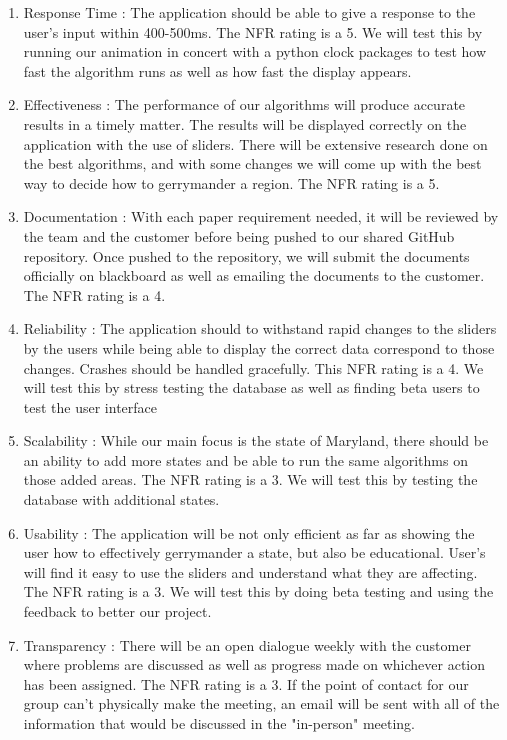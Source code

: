 \documentclass{article}
\begin{document}
\begin{addmargin}[2em]{0em}
\begin{enumerate}

\item Response Time : The application should be able to give a response to the user's input within 400-500ms. The NFR rating is a 5. We will test this by running our animation in concert with a python clock packages to test how fast the algorithm runs as well as how fast the display appears.

\item Effectiveness : The performance of our algorithms will produce accurate results in a timely matter. The results will be displayed correctly on the application with the use of sliders. There will be extensive research done on the best algorithms, and with some changes we will come up with the best way to decide how to gerrymander a region. The NFR rating is a 5.

\item Documentation : With each paper requirement needed, it will be reviewed by the team and the customer before being pushed to our shared GitHub repository. Once pushed to the repository, we will submit the documents officially on blackboard as well as emailing the documents to the customer. The NFR rating is a 4. 

\item Reliability : The application should to withstand rapid changes to the sliders by the users while being able to display the correct data correspond to those changes. Crashes should be handled gracefully. This NFR rating is a 4. We will test this by stress testing the database as well as finding beta users to test the user interface

\item Scalability : While our main focus is the state of Maryland, there should be an ability to add more states and be able to run the same algorithms on those added areas. The NFR rating is a 3. We will test this by testing the database with additional states.

\item Usability : The application will be not only efficient as far as showing the user how to effectively gerrymander a state, but also be educational. User's will find it easy to use the sliders and understand what they are affecting. The NFR rating is a 3. We will test this by doing beta testing and using the feedback to better our project. 

\item Transparency : There will be an open dialogue weekly with the customer where problems are discussed as well as progress made on whichever action has been assigned. The NFR rating is a 3. If the point of contact for our group can't physically make the meeting, an email will be sent with all of the information that would be discussed in the "in-person" meeting.


\end{enumerate}
\end{addmargin}
\end{document}
